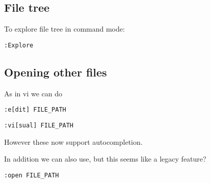\subsection{File tree}

To explore file tree in command mode:
\begin{verbatim}
:Explore
\end{verbatim}


\subsection{Opening other files}

As in vi we can do 
\begin{verbatim}
:e[dit] FILE_PATH
\end{verbatim}

\begin{verbatim}
:vi[sual] FILE_PATH
\end{verbatim}

However these now support autocompletion.

In addition we can also use, but this seems like a legacy feature?

\begin{verbatim}
:open FILE_PATH
\end{verbatim}


